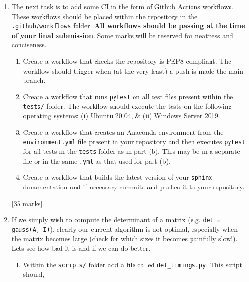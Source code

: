 \documentclass[a4paper,11pt]{article}
\begin{document}
\begin{enumerate}
\begin{enumerate}
 \textbf{Important:} This file should be continuously updated to test the docstrings of any
 new functions added later.
 \item Finally for part 1, using \texttt{sphinx} and the files present in \texttt{docs/} build
 the documentation. The final form of the documentation should be a pdf file named 
 \texttt{mpm\_la.pdf} located in the \texttt{docs/} folder. Note, using \texttt{sphinx} you'll
 first create html files and then these should be compiled into the pdf.
 \textbf{This documentation
 should also be continuously updated such that on submission it reflects the final state of your repository.}
\end{enumerate}
[35 marks]
\item The next task is to add some CI in the form of Github Actions workflows. These workflows should
be placed within the repository in the \texttt{.github/workflows} folder. \textbf{All workflows should
be passing at the time of your final submission}. Some marks will be reserved for neatness and conciseness.
\begin{enumerate}
 \item Create a workflow that checks the repository is PEP8 compliant. The workflow should trigger when
 (at the very least) a push is made the main branch.
 \item Create a workflow that runs \texttt{pytest} on all test files present within the \texttt{tests/}
 folder. The workflow should execute the tests on the following operating systems: (i) Ubuntu 20.04,
 \& (ii) Windows Server 2019.
 \item Create a workflow that creates an Anaconda environment from the \texttt{environment.yml} file
 present in your repository and then executes \texttt{pytest} for all tests in the \texttt{tests} folder
 as in part (b). This may be in a separate file or in the same \texttt{.yml} as that used for part (b).
 \item Create a workflow that builds the latest version of your \texttt{sphinx} documentation and if
 necessary commits and pushes it to your repository.
\end{enumerate}
[35 marks]
\item If we simply wish to compute the determinant of a matrix (e.g. \texttt{det = gauss(A, I)}),
clearly our current algorithm is not optimal, especially when the matrix becomes large
(check for which sizes it becomes painfully slow!). Lets see how bad it is and if we can do better.
\begin{enumerate}
 \item Within the \texttt{scripts/} folder add a file called \texttt{det\_timings.py}. This script should,

\end{enumerate}
\end{enumerate}
\end{document}
